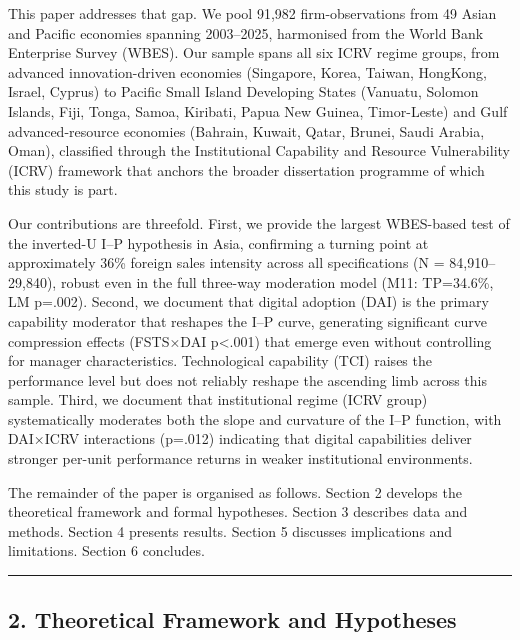 \documentclass[12pt,a4paper]{article}
\begin{document}
This paper addresses that gap. We pool 91,982 firm-observations from 49
Asian and Pacific economies spanning 2003--2025, harmonised from the
World Bank Enterprise Survey (WBES). Our sample spans all six ICRV
regime groups, from advanced innovation-driven economies (Singapore,
Korea, Taiwan, HongKong, Israel, Cyprus) to Pacific Small Island
Developing States (Vanuatu, Solomon Islands, Fiji, Tonga, Samoa,
Kiribati, Papua New Guinea, Timor-Leste) and Gulf advanced-resource
economies (Bahrain, Kuwait, Qatar, Brunei, Saudi Arabia, Oman),
classified through the Institutional Capability and Resource
Vulnerability (ICRV) framework that anchors the broader dissertation
programme of which this study is part.

Our contributions are threefold. First, we provide the largest
WBES-based test of the inverted-U I--P hypothesis in Asia, confirming a
turning point at approximately 36\% foreign sales intensity across all
specifications (N = 84,910--29,840), robust even in the full three-way
moderation model (M11: TP=34.6\%, LM p=.002). Second, we document that
digital adoption (DAI) is the primary capability moderator that reshapes
the I--P curve, generating significant curve compression effects
(FSTS×DAI p\textless.001) that emerge even without controlling for
manager characteristics. Technological capability (TCI) raises the
performance level but does not reliably reshape the ascending limb
across this sample. Third, we document that institutional regime (ICRV
group) systematically moderates both the slope and curvature of the I--P
function, with DAI×ICRV interactions (p=.012) indicating that digital
capabilities deliver stronger per-unit performance returns in weaker
institutional environments.

The remainder of the paper is organised as follows. Section 2 develops
the theoretical framework and formal hypotheses. Section 3 describes
data and methods. Section 4 presents results. Section 5 discusses
implications and limitations. Section 6 concludes.

\begin{center}\rule{0.5\linewidth}{0.5pt}\end{center}

\hypertarget{2-theoretical-framework-and-hypotheses}{%
\subsection{2. Theoretical Framework and
Hypotheses}\label{2-theoretical-framework-and-hypotheses}}
\end{document}
